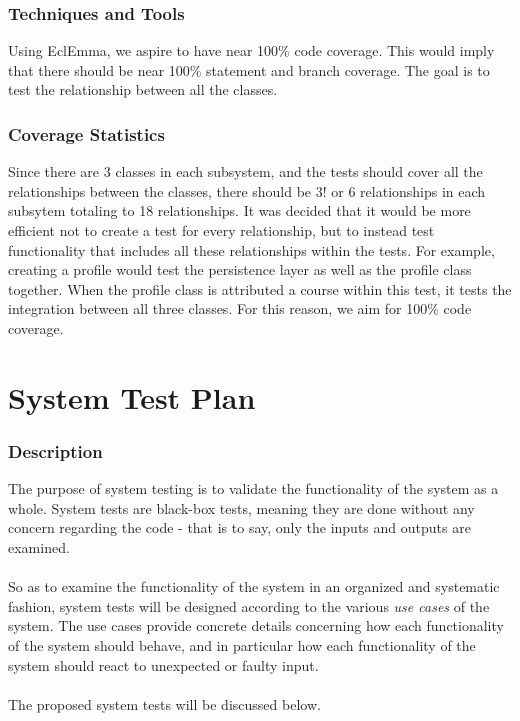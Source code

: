 \documentclass[12pt]{report}
\begin{document}
\section{Techniques and Tools}
Using EclEmma, we aspire to have near 100\% code coverage. This would imply that there should be near 100\% statement and branch coverage. The goal is to test the relationship between all the classes.

\section{Coverage Statistics}
Since there are 3 classes in each subsystem, and the tests should cover all the relationships between the classes, there should be 3! or 6 relationships in each subsytem totaling to 18 relationships. It was decided that it would be more efficient not to create a test for every relationship, but to instead test functionality that includes all these relationships within the tests. For example, creating a profile would test the persistence layer as well as the profile class together. When the profile class is attributed a course within this test, it tests the integration between all three classes. For this reason, we aim for 100\% code coverage.

\part{System Test Plan}
\section{Description}
The purpose of system testing is to validate the functionality of the system as a whole. System
tests are black-box tests, meaning they are done without any concern regarding the code - that is to
say, only the inputs and outputs are examined.\\\\
So as to examine the functionality of the system in an organized and systematic fashion, system
tests will be designed according to the various \textit{use cases} of the system. The use cases
provide concrete details concerning how each functionality of the system should behave, and in
particular how each functionality of the system should react to unexpected or faulty input.\\\\
The proposed system tests will be discussed below.
\end{document}
